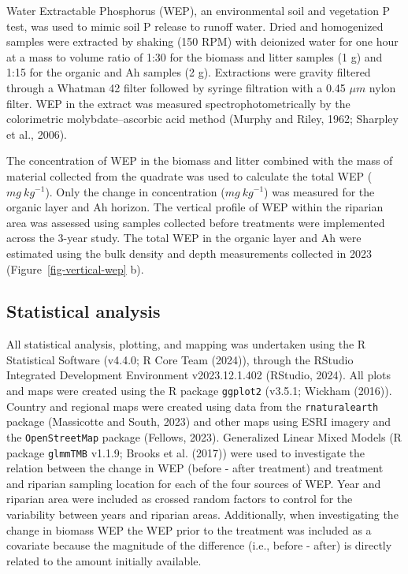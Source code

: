 \documentclass[
]{agujournal2019}
\begin{document}
Water Extractable Phosphorus (WEP), an environmental soil and vegetation
P test, was used to mimic soil P release to runoff water. Dried and
homogenized samples were extracted by shaking (150 RPM) with deionized
water for one hour at a mass to volume ratio of 1:30 for the biomass and
litter samples (1 g) and 1:15 for the organic and Ah samples (2 g).
Extractions were gravity filtered through a Whatman 42 filter followed
by syringe filtration with a 0.45 \(\mu m\) nylon filter. WEP in the
extract was measured spectrophotometrically by the colorimetric
molybdate--ascorbic acid method (Murphy and Riley, 1962; Sharpley et
al., 2006).

The concentration of WEP in the biomass and litter combined with the
mass of material collected from the quadrate was used to calculate the
total WEP (\(mg~kg^{-1}\)). Only the change in concentration
(\(mg~kg^{-1}\)) was measured for the organic layer and Ah horizon. The
vertical profile of WEP within the riparian area was assessed using
samples collected before treatments were implemented across the 3-year
study. The total WEP in the organic layer and Ah were estimated using
the bulk density and depth measurements collected in 2023
(Figure~\ref{fig-vertical-wep} b).

\subsection{Statistical analysis}\label{statistical-analysis}

All statistical analysis, plotting, and mapping was undertaken using the
R Statistical Software (v4.4.0; R Core Team (2024)), through the RStudio
Integrated Development Environment v2023.12.1.402 (RStudio, 2024). All
plots and maps were created using the R package \texttt{ggplot2}
(v3.5.1; Wickham (2016)). Country and regional maps were created using
data from the \texttt{rnaturalearth} package (Massicotte and South,
2023) and other maps using ESRI imagery and the \texttt{OpenStreetMap}
package (Fellows, 2023). Generalized Linear Mixed Models (R package
\texttt{glmmTMB} v1.1.9; Brooks et al. (2017)) were used to investigate
the relation between the change in WEP (before - after treatment) and
treatment and riparian sampling location for each of the four sources of
WEP. Year and riparian area were included as crossed random factors to
control for the variability between years and riparian areas.
Additionally, when investigating the change in biomass WEP the WEP prior
to the treatment was included as a covariate because the magnitude of
the difference (i.e., before - after) is directly related to the amount
initially available.
\end{document}

